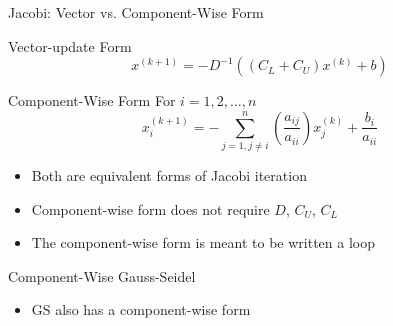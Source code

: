 \documentclass[10pt]{beamer}
\begin{document}
\begin{frame}[fragile]{Jacobi: Vector vs. Component-Wise Form}

    \begin{block}{Vector-update Form}
        \begin{equation*}
        x^{(k+1)} = -D^{-1}((C_L + C_U)x^{(k)}+b)
        \end{equation*}
    \end{block}
    \begin{block}{Component-Wise Form}
    For $i= 1,2,\ldots, n$
        \begin{equation*}
        x_{i}^{(k+1)} = -\sum_{j=1,j\ne i}^{n} \left(\frac{a_{ij}}{a_{ii}}\right) x_{j}^{(k)} + \frac{b_{i}}{a_{ii}}
        \end{equation*} 
    \end{block}

    \vspace{3mm}
    \begin{itemize}
        \item Both are equivalent forms of Jacobi iteration
        \item Component-wise form does not require $D$, $C_U$, $C_L$
        \item The component-wise form is meant to be written a loop
    \end{itemize}


\end{frame}


\begin{frame}{Component-Wise Gauss-Seidel}
\begin{itemize}

    \begin{block}{Vector-update Form}
        \begin{equation*}
        x^{(k)} = -(D+C_L)^{-1}C_U x^{(k-1)} + (D+C_L)^{-1}b
        \end{equation*}
    \end{block}
    \begin{block}{Component-wise Form}
    For $i= 1,2,\ldots, n$
        \begin{equation*}
        x_{i}^{(k)} = -\sum_{j=1}^{i-1} \left(\frac{a_{ij}}{a_{ii}}\right) x_{j}^{(k)} -\sum_{j=i+1}^{n} \left(\frac{a_{ij}}{a_{ii}}\right) x_{j}^{(k-1)} + \frac{b_{i}}{a_{ii}}
        \end{equation*} 

    \end{block}
\vspace{5mm}

\item GS also has a component-wise form 

\end{itemize}
\end{frame}
\end{document}

